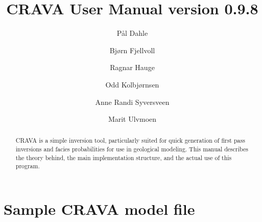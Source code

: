 \documentclass[screen,note,long,backref,indentpar]{nrdoc}
\title{CRAVA User Manual version 0.9.8}
\author{P{\aa}l Dahle\and Bj{\o}rn Fjellvoll\and Ragnar Hauge\and Odd Kolbj{\o}rnsen\and Anne Randi Syversveen\and Marit Ulvmoen }
\newcommand{\crava} {\textsf{CRAVA}\xspace}
\begin{document}
\maketitle

\begin{abstract}
CRAVA is a simple inversion tool, particularly suited for quick generation of first pass inversions and facies probabilities for use in geological modeling. This manual describes the theory behind, the main implementation structure, and the actual use of this program.
\end{abstract}

\tableofcontents
\clearemptydoublepage



\newpage

\newpage

\newpage



\appendix


\chapter{Sample \crava model file}
\label{sec:crava-model-file}

\vspace{-2em}
\end{document}
